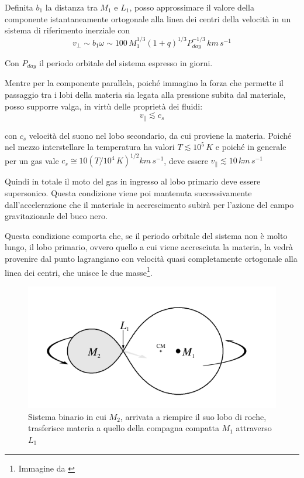 \documentclass[a4paperbi]{article}
\begin{document}
	Definita $b_1$ la distanza tra $M_1$ e $L_1$, posso approssimare il valore della componente istantaneamente ortogonale alla linea dei centri della velocità in un sistema di riferimento inerziale con
	\begin{equation}
		v_\perp\sim b_1\omega\sim 100\,M_1^{1/3}(1+q)^{1/3}P^{-1/3}_{day}\,km\,s^{-1}
	\end{equation}  
	
	Con $P_{day}$ il periodo orbitale del sistema espresso in giorni.
	
	Mentre per la componente parallela, poiché immagino la forza che permette il passaggio tra i lobi della materia sia legata alla pressione subita dal materiale, posso supporre valga, in virtù delle proprietà dei fluidi:
	\begin{equation}
		v_\parallel \lesssim c_{s}
	\end{equation}
	
	con $c_{s}$ velocità del suono nel lobo secondario, da cui proviene la materia. Poiché nel mezzo interstellare la temperatura ha valori $T\lesssim10^5\,K$ e poiché in generale per un gas vale $c_s\cong10(T/10^4\,K)^{1/2}km\,s^{-1}$, deve essere $v_\parallel\lesssim10\,km\,s^{-1}$
	
	Quindi in totale il moto del gas in ingresso al lobo primario deve essere supersonico. Questa condizione viene poi mantenuta successivamente dall'accelerazione che il materiale in accrescimento subirà per l'azione del campo gravitazionale del buco nero.
	
	Questa condizione comporta che, se il periodo orbitale del sistema non è molto lungo, il lobo primario, ovvero quello a cui viene accresciuta la materia, la vedrà provenire dal punto lagrangiano con velocità quasi completamente ortogonale alla linea dei centri, che unisce le due masse\footnote{Immagine da \cite{FrankKingRaineAccretionPower}}.
	
	\begin{figure}[H]
		\centering
		\includegraphics[width=0.8\linewidth]{LobeFilling}
		\caption{Sistema binario in cui $M_2$, arrivata a riempire il suo lobo di roche, trasferisce materia a quello della compagna compatta $M_1$ attraverso $L_1$}
		\label{fig:lobefilling}
	\end{figure}
	
\end{document}
